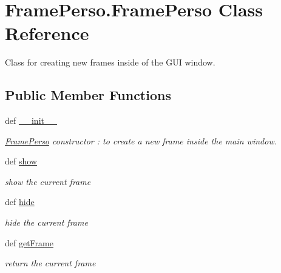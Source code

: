 \hypertarget{classFramePerso_1_1FramePerso}{\section{Frame\+Perso.\+Frame\+Perso Class Reference}
\label{classFramePerso_1_1FramePerso}
}


Class for creating new frames inside of the G\+U\+I window.  


\subsection*{Public Member Functions}
\begin{DoxyCompactItemize}
\item 
def \hyperlink{classFramePerso_1_1FramePerso_abea90e125f725878b582758fc6598248}{\+\_\+\+\_\+init\+\_\+\+\_\+}
\begin{DoxyCompactList}\small\item\em \hyperlink{classFramePerso_1_1FramePerso}{Frame\+Perso} constructor \+: to create a new frame inside the main window. \end{DoxyCompactList}\item 
\hypertarget{classFramePerso_1_1FramePerso_aefa50176848dcc8831ed70697ee07d97}{def \hyperlink{classFramePerso_1_1FramePerso_aefa50176848dcc8831ed70697ee07d97}{show}}\label{classFramePerso_1_1FramePerso_aefa50176848dcc8831ed70697ee07d97}

\begin{DoxyCompactList}\small\item\em show the current frame \end{DoxyCompactList}\item 
\hypertarget{classFramePerso_1_1FramePerso_a9799f39004ccec3e417474862b6063e4}{def \hyperlink{classFramePerso_1_1FramePerso_a9799f39004ccec3e417474862b6063e4}{hide}}\label{classFramePerso_1_1FramePerso_a9799f39004ccec3e417474862b6063e4}

\begin{DoxyCompactList}\small\item\em hide the current frame \end{DoxyCompactList}\item 
\hypertarget{classFramePerso_1_1FramePerso_acb78b6f6fc21c34535fa360ae8870230}{def \hyperlink{classFramePerso_1_1FramePerso_acb78b6f6fc21c34535fa360ae8870230}{get\+Frame}}\label{classFramePerso_1_1FramePerso_acb78b6f6fc21c34535fa360ae8870230}

\begin{DoxyCompactList}\small\item\em return the current frame \end{DoxyCompactList}\end{DoxyCompactItemize}
